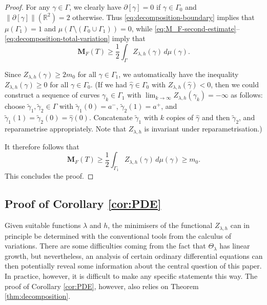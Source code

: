\documentclass[a4paper]{article}
\newcommand{\R}{\mathbb{R}}
\newcommand{\M}{\mathbf{M}}
\theoremstyle{definition}
\theoremstyle{remark}
\begin{document}
\begin{proof}
For any $\gamma \in \Gamma$, we clearly have $\partial [\gamma] = 0$
if $\gamma \in \Gamma_0$ and $\|\partial [\gamma]\|(\R^2) = 2$
otherwise. Thus \eqref{eq:decomposition-boundary} implies that
$\mu(\Gamma_1) = 1$ and $\mu(\Gamma \setminus (\Gamma_0 \cup \Gamma_1)) = 0$,
while \eqref{eq:M_F-second-estimate}--\eqref{eq:decomposition-total-variation} imply that
\[
\M_F(T) \ge \frac{1}{2} \int_\Gamma Z_{\lambda, h}(\gamma) \, d\mu(\gamma).
\]

Since $Z_{\lambda, h}(\gamma) \ge 2m_0$ for all $\gamma \in \Gamma_1$, we automatically have the inequality $Z_{\lambda, h}(\gamma) \ge 0$
for all $\gamma \in \Gamma_0$. (If we had $\hat{\gamma} \in \Gamma_0$ with $Z_{\lambda, h}(\hat{\gamma}) < 0$,
then we could construct a sequence of curves $\gamma_k \in \Gamma_1$ with
$\lim_{k \to \infty} Z_{\lambda, h}(\gamma_k) = - \infty$ as follows: choose
$\tilde{\gamma}_1, \tilde{\gamma}_2 \in \Gamma$ with $\tilde{\gamma}_1(0) = a^-$,
$\tilde{\gamma}_2(1) = a^+$, and
$\tilde{\gamma}_1(1) = \tilde{\gamma}_2(0) = \hat{\gamma}(0)$.
Concatenate $\tilde{\gamma}_1$ with $k$ copies of $\hat{\gamma}$ and then
$\tilde{\gamma}_2$, and reparametrise appropriately. Note that
$Z_{\lambda, h}$ is invariant under reparametrisation.)

It therefore follows that
\[
\M_F(T) \ge \frac{1}{2} \int_{\Gamma_1} Z_{\lambda, h}(\gamma) \, d\mu(\gamma) \ge m_0.
\]
This concludes the proof.
\end{proof}







\subsection{Proof of Corollary \ref{cor:PDE}}

Given suitable functions $\lambda$ and $h$, the minimisers of the functional $Z_{\lambda, h}$
can in principle be determined with the conventional tools from the calculus of
variations. There are some difficulties coming from the fact that $\Theta_\lambda$ has linear
growth, but nevertheless, an analysis of certain ordinary differential equations can then potentially reveal some
information about the central question of this paper. In practice, however, it is difficult to
make any specific statements this way. The proof of Corollary \ref{cor:PDE}, however, also relies on Theorem \ref{thm:decomposition}.
\end{document}
